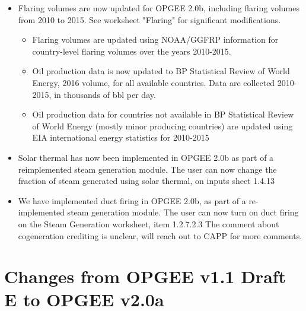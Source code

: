 \documentclass[11pt]{report}
\begin{document}
\begin{itemize}
\item Flaring volumes are now updated for OPGEE 2.0b, including flaring volumes from 2010 to 2015. See worksheet "Flaring" for significant modifications.
	\begin{itemize}
	\item Flaring volumes are updated using NOAA/GGFRP information for country-level flaring volumes over the years 2010-2015.
	\item Oil production data is now updated to BP Statistical Review of World Energy, 2016 volume, for all available countries. Data are collected 2010-2015, in thousands of bbl per day.
	\item Oil production data for countries not available in BP Statistical Review of World Energy (mostly minor producing countries) are updated using EIA international energy statistics for 2010-2015
	\end{itemize}
\item Solar thermal has now been implemented in OPGEE 2.0b as part of a reimplemented steam generation module. The user can now change the fraction of steam generated using solar thermal, on inputs sheet 1.4.13

\item We have implemented duct firing in OPGEE 2.0b, as part of a re-implemented steam generation module. The user can now turn on duct firing on the Steam Generation worksheet, item 1.2.7.2.3
The comment about cogeneration crediting is unclear, will reach out to CAPP for more comments.
\end{itemize}




\section{Changes from OPGEE v1.1 Draft E to OPGEE v2.0a}
\end{document}

